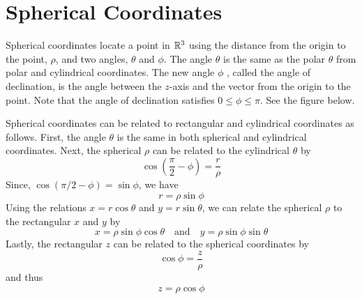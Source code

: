 \documentclass[handout]{ximera}
\begin{document}
\section{Spherical Coordinates}
Spherical coordinates locate a point in $\mathbb R^3$ using the distance from the origin to the point, $\rho$,  
and two angles, $\theta$ and $\phi$. The angle $\theta$ is the same as the polar $\theta$ from polar and cylindrical coordinates.
The new angle $\phi$ , called the angle of declination, is the angle between the $z$-axis and the vector from the origin to the point.
Note that the angle of declination satisfies $0 \leq \phi \leq \pi$.
See the figure below.
\begin{image}
\end{image}

Spherical coordinates can be related to rectangular and cylindrical coordinates as follows. First, the angle $\theta$ is the same in 
both spherical and cylindrical coordinates. Next, the spherical $\rho$ can be related to the cylindrical $\theta$ by
\[
\cos\left(\frac{\pi}{2} - \phi\right) = \frac{r}{\rho}
\]
Since, $\cos(\pi/2 - \phi) = \sin \phi$, we have
\[
r = \rho \sin \phi
\]
Using the relations $x = r\cos \theta$ and $y = r\sin \theta$, we can relate the spherical $\rho$ to the rectangular $x$ and $y$ by
\[
x = \rho \sin \phi \cos \theta \quad \text{and} \quad y = \rho \sin \phi \sin \theta
\]
Lastly, the rectangular $z$ can be related to the spherical coordinates by
\[
\cos \phi = \frac{z}{\rho}
\]
and thus
\[
z = \rho \cos \phi
\]
\end{document}
